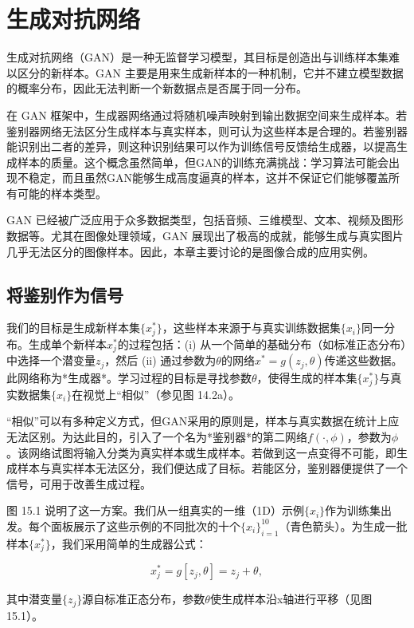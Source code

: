 \chapter{生成对抗网络}

生成对抗网络（GAN）是一种无监督学习模型，其目标是创造出与训练样本集难以区分的新样本。GAN 主要是用来生成新样本的一种机制，它并不建立模型数据的概率分布，因此无法判断一个新数据点是否属于同一分布。

在 GAN 框架中，生成器网络通过将随机噪声映射到输出数据空间来生成样本。若鉴别器网络无法区分生成样本与真实样本，则可认为这些样本是合理的。若鉴别器能识别出二者的差异，则这种识别结果可以作为训练信号反馈给生成器，以提高生成样本的质量。这个概念虽然简单，但GAN的训练充满挑战：学习算法可能会出现不稳定，而且虽然GAN能够生成高度逼真的样本，这并不保证它们能够覆盖所有可能的样本类型。

GAN 已经被广泛应用于众多数据类型，包括音频、三维模型、文本、视频及图形数据等。尤其在图像处理领域，GAN 展现出了极高的成就，能够生成与真实图片几乎无法区分的图像样本。因此，本章主要讨论的是图像合成的应用实例。

\section{将鉴别作为信号}
我们的目标是生成新样本集\(\{x_j^*\}\)，这些样本来源于与真实训练数据集\(\{x_i\}\)同一分布。生成单个新样本\(x_j^*\)的过程包括：(i) 从一个简单的基础分布（如标准正态分布）中选择一个潜变量\(z_j\)，然后 (ii) 通过参数为\(\theta\)的网络\(x^* = g(z_j, \theta)\)传递这些数据。此网络称为*生成器*。学习过程的目标是寻找参数\(\theta\)，使得生成的样本集\(\{x_j^*\}\)与真实数据集\(\{x_i\}\)在视觉上“相似”（参见图 14.2a）。

“相似”可以有多种定义方式，但GAN采用的原则是，样本与真实数据在统计上应无法区别。为达此目的，引入了一个名为*鉴别器*的第二网络\(f(\cdot, \phi)\)，参数为\(\phi\)。该网络试图将输入分类为真实样本或生成样本。若做到这一点变得不可能，即生成样本与真实样本无法区分，我们便达成了目标。若能区分，鉴别器便提供了一个信号，可用于改善生成过程。

图 15.1 说明了这一方案。我们从一组真实的一维（1D）示例\(\{x_i\}\)作为训练集出发。每个面板展示了这些示例的不同批次的十个\(\{x_i\}^{10}_{i=1}\)（青色箭头）。为生成一批样本\(\{x_j^*\}\)，我们采用简单的生成器公式：

\begin{equation}
x_j^* = g[z_j, \theta] = z_j + \theta, 
\end{equation}

其中潜变量\(\{z_j\}\)源自标准正态分布，参数\(\theta\)使生成样本沿x轴进行平移（见图 15.1）。

